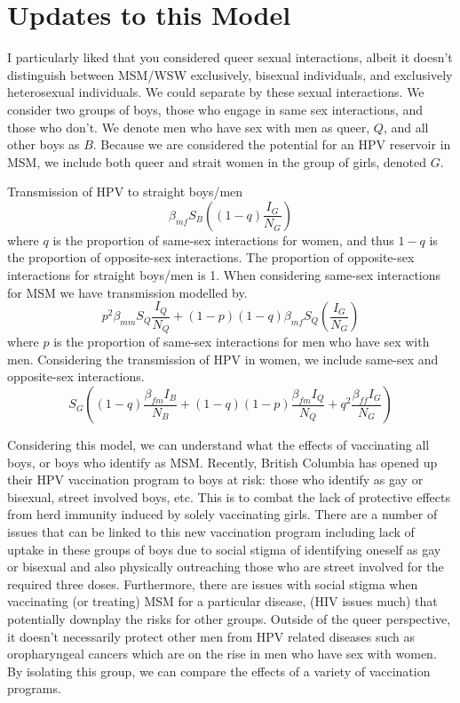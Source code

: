 \documentclass[12pt]{article}
\begin{document}
\section{Updates to this Model}

I particularly liked that you considered queer sexual interactions, albeit it doesn't distinguish between MSM/WSW exclusively, bisexual individuals, and exclusively heterosexual individuals.  We could separate by these sexual interactions.  We consider two groups of boys, those who engage in same sex interactions, and those who don't.  We denote men who have sex with men as queer, $Q$, and all other boys as $B$.  Because we are considered the potential for an HPV reservoir in MSM, we include both queer and strait women in the group of girls, denoted $G$.  
 
Transmission of HPV to straight boys/men
\begin{equation}
\beta_{mf}S_{B}\left((1-q)\frac{I_{G}}{N_{G}}\right)
\end{equation}
where $q$ is the proportion of same-sex interactions for women, and thus $1-q$ is the proportion of opposite-sex interactions. The proportion of opposite-sex interactions for straight boys/men is 1.  When considering same-sex interactions for MSM we have transmission modelled by.
\begin{equation}
p^2\beta_{mm}S_{Q}\frac{I_{Q}}{N_{Q}}+(1-p)(1-q)\beta_{mf}S_Q\left(\frac{I_G}{N_G}\right)
\end{equation}
where $p$ is the proportion of same-sex interactions for men who have sex with men.  Considering the transmission of HPV in women, we include same-sex and opposite-sex interactions.  
\begin{equation}
S_G\left((1-q)\frac{\beta_{fm}I_B}{N_B}+(1-q)(1-p)\frac{\beta_{fm}I_Q}{N_Q}+q^2\frac{\beta_{ff}I_G}{N_G}\right)
\end{equation}
 



Considering this model, we can understand what the effects of vaccinating all boys, or boys who identify as MSM.  Recently, British Columbia has opened up their HPV vaccination program to boys at risk: those who identify as gay or bisexual, street involved boys, etc. This is to combat the lack of protective effects from herd immunity induced by solely vaccinating girls.  There are a number of issues that can be linked to this new vaccination program including lack of uptake in these groups of boys due to social stigma of identifying oneself as gay or bisexual and also physically outreaching those who are street involved for the required three doses. Furthermore, there are issues with social stigma when vaccinating (or treating) MSM for a particular disease, (HIV issues much) that potentially downplay the risks for other groups.  Outside of the queer perspective, it doesn't necessarily protect other men from HPV related diseases such as oropharyngeal cancers which are on the rise in men who have sex with women.  By isolating this group, we can compare the effects of a variety of vaccination programs. 
\end{document}
